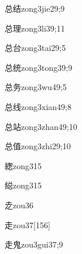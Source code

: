 \begin{verbete}{总结}{zong3jie2}{9;9}
\end{verbete}

\begin{verbete}{总理}{zong3li3}{9;11}
\end{verbete}

\begin{verbete}{总台}{zong3tai2}{9;5}
\end{verbete}

\begin{verbete}{总统}{zong3tong3}{9;9}
\end{verbete}

\begin{verbete}{总务}{zong3wu4}{9;5}
\end{verbete}

\begin{verbete}{总线}{zong3xian4}{9;8}
\end{verbete}

\begin{verbete}{总站}{zong3zhan4}{9;10}
\end{verbete}

\begin{verbete}{总值}{zong3zhi2}{9;10}
\end{verbete}

\begin{verbete}{緫}{zong3}{15}
\end{verbete}

\begin{verbete}{縂}{zong3}{15}
\end{verbete}

\begin{verbete}{赱}{zou3}{6}
\end{verbete}

\begin{verbete}{走}{zou3}{7}[156]
\end{verbete}

\begin{verbete}{走鬼}{zou3gui3}{7;9}
\end{verbete}

